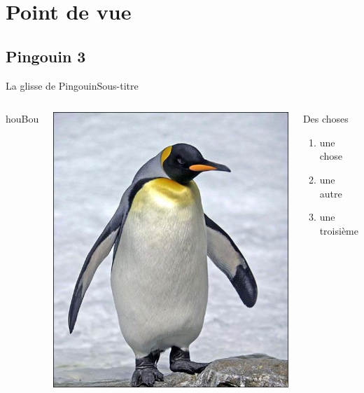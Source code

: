 \documentclass[usenames,dvipsnames, 12pt]{beamer}
\begin{document}
\section{Point de vue}
\subsection{Pingouin 3}
 \begin{frame}{La glisse de Pingouin}{Sous-titre}
	\begin{columns}	
	\begin{center}
		houBou
	\end{center}
	\includegraphics[angle = 180, width = .8\textwidth]{Pingouin}
	
  		\begin{block}{Des choses}
  			\begin{enumerate}
  			\item	une chose
  			\item	une autre
  			\item	une troisième
  			\end{enumerate}
  		\end{block}
  		\end{columns}
 \end{frame}
\end{document}
